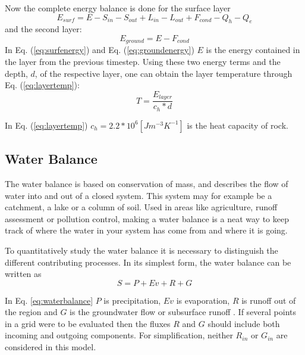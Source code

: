 \documentclass[a4paper,11pt,twocolumn]{article}
\begin{document}
Now the complete energy balance is done for the surface layer \cite{dingman}  
\begin{equation}
	E_{surf} = E-S_{in}-S_{out}+L_{in}-L_{out}+F_{cond}-Q_h-Q_e
	\label{eq:surfenergy}
\end{equation}
and the second layer:
\begin{equation}
E_{ground} = E-F_{cond}
	\label{eq:groundenergy}
\end{equation}
In Eq. (\ref{eq:surfenergy}) and Eq. (\ref{eq:groundenergy}) $E$ is the energy contained in the layer from the previous timestep. Using these two energy terms and the depth, $d$, of the respective layer, one can obtain the layer temperature through Eq. (\ref{eq:layertemp}):
\begin{equation}
	T = \frac{E_{layer}}{c_h*d}
	\label{eq:layertemp}
\end{equation}

In Eq. (\ref{eq:layertemp}) $c_h = 2.2*10^6 [Jm^{-3}K^{-1}]$ is the heat capacity of rock.  


\subsection{Water Balance}
The water balance is based on conservation of mass, and describes the flow of water into and out of a closed system. This system may for example be a catchment, a lake or a column of soil. Used in areas like agriculture, runoff assessment or pollution control, making a water balance is a neat way to keep track of where the water in your system has come from and where it is going. 

To quantitatively study the water balance it is necessary to distinguish the different contributing processes. In its simplest form, the water balance can be written as \cite{dingman} 
\begin{equation}
	S = P + Ev + R + G 
	\label{eq:waterbalance}
\end{equation}

In Eq. \ref{eq:waterbalance} $P$ is precipitation, $Ev$ is evaporation, $R$ is runoff out of the region and $G$ is the groundwater flow or subsurface runoff \cite{dingman}. If several points in a grid were to be evaluated then the fluxes $R$ and $G$ should include both incoming and outgoing components. For simplification, neither $R_{in}$ or $G_{in}$ are considered in this model.   
\end{document}
